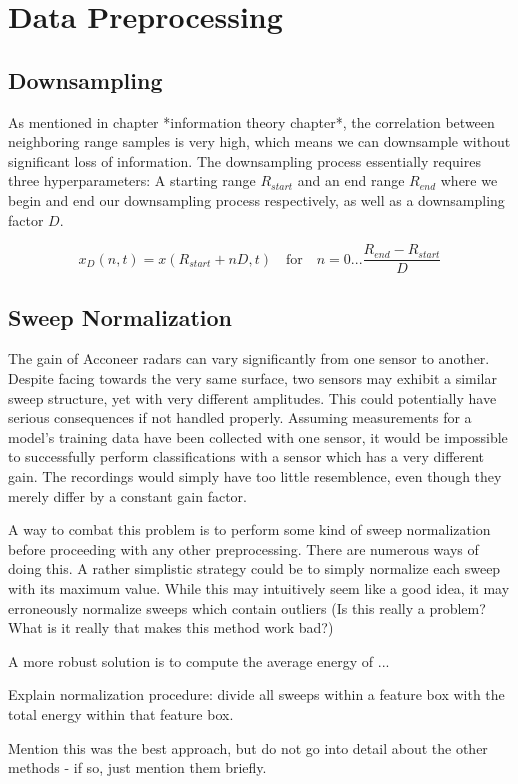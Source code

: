 \chapter{Data Preprocessing}
\section{Downsampling}
As mentioned in chapter *information theory chapter*, the correlation between neighboring range samples is very high, which means we can downsample without significant loss of information. The downsampling process essentially requires three hyperparameters: A starting range $R_{start}$ and an end range $R_{end}$ where we begin and end our downsampling process respectively, as well as a downsampling factor $D$.

\begin{equation}
	x_D(n, t) = x(R_{start} + nD, t) \quad \text{for}\quad n=0...\frac{R_{end}-R_{start}}{D}
\end{equation}

\section{Sweep Normalization}
The gain of Acconeer radars can vary significantly from one sensor to another. Despite facing towards the very same surface, two sensors may exhibit a similar sweep structure,  yet with very different amplitudes. This could potentially have serious consequences if not handled properly. Assuming measurements for a model's training data have been collected with one sensor, it would be impossible to successfully perform classifications with a sensor which has a very different gain. The recordings would simply have too little resemblence, even though they merely differ by a constant gain factor.

A way to combat this problem is to perform some kind of sweep normalization before proceeding with any other preprocessing. There are numerous ways of doing this. A rather simplistic strategy could be to simply normalize each sweep with its maximum value. While this may intuitively seem like a good idea, it may erroneously normalize sweeps which contain outliers (Is this really a problem? What is it really that makes this method work bad?)

A more robust solution is to compute the average energy of ...

Explain normalization procedure: divide all sweeps within a feature box with the total energy within that feature box. 

Mention this was the best approach, but do not go into detail about the other methods - if so, just mention them briefly.
